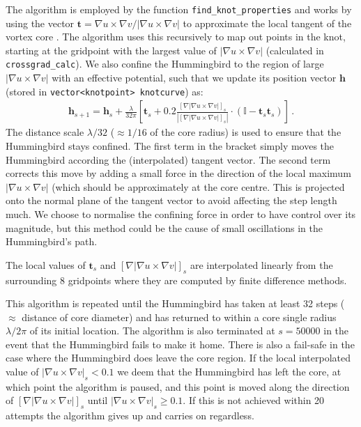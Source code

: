 \documentclass[notitlepage,aps,amsmath,amssymb,11pt]{revtex4-1}
\newcommand{\sqb}[1]{\left[ #1 \right]}
\newcommand{\norm}[1]{\left| #1 \right|}
\renewcommand{\vec}[1]{\boldsymbol{#1}}
\begin{document}
The algorithm is employed by the function \verb'find_knot_properties' and works by using the vector $\vec{t} = \nabla u \times \nabla v/\norm{\nabla u \times \nabla v}$ to approximate the local tangent of the vortex core \cite{Winfree1990}. The algorithm uses this recursively to map out points in the knot, starting at the gridpoint with the largest value of $\norm{\nabla u \times \nabla v}$ (calculated in \verb'crossgrad_calc'). We also confine the Hummingbird to the region of large $\norm{\nabla u \times \nabla v}$ with an effective potential, such that we update its position vector $\vec{h}$  (stored in \verb'vector<knotpoint> knotcurve') as:
\begin{align}
\vec{h}_{s+1} = \vec{h}_s + \frac{\lambda}{32 \pi} \sqb{\vec{t}_{s} + 0.2 \frac{[\nabla \norm{\nabla u \times \nabla v}]_s}{\norm{[\nabla \norm{\nabla u \times \nabla v}]_s}}\cdot(\mathbb{I} - \vec{t}_s\vec{t}_s)} \, .
\end{align}
The distance scale $\lambda/32$ ($\approx 1/16$ of the core radius) is used to ensure that the Hummingbird stays confined. The first term in the bracket simply moves the Hummingbird according the (interpolated) tangent vector. The second term corrects this move by adding a small force in the direction of the local maximum $\norm{\nabla u \times \nabla v}$ (which should be approximately at the core centre. This is projected onto the normal plane of the tangent vector to avoid affecting the step length much. We choose to normalise the confining force in order to have control over its magnitude, but this method could be the cause of small oscillations in the Hummingbird's path.

The local values of $\vec{t}_{s}$ and $[\nabla \norm{\nabla u \times \nabla v}]_s$ are interpolated linearly from the surrounding 8 gridpoints where they are computed by finite difference methods. 

This algorithm is repeated until the Hummingbird has taken at least 32 steps ($\approx$ distance of core diameter) and has returned to within a core single radius $\lambda/2\pi$ of its initial location. The algorithm is also terminated at $s=50000$ in the event that the Hummingbird fails to make it home. There is also a fail-safe in the case where the Hummingbird does leave the core region. If the local interpolated value of $\norm{\nabla u \times \nabla v}_s < 0.1$ we deem that the Hummingbird has left the core, at which point the algorithm is paused, and this point is moved along the direction of $[\nabla \norm{\nabla u \times \nabla v}]_s$ until $\norm{\nabla u \times \nabla v}_s \geq 0.1$. If this is not achieved within 20 attempts the algorithm gives up and carries on regardless.
\end{document}
